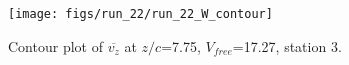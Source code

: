 \begin{figure}[H]
\centering
\texttt{[image: figs/run\_22/run\_22\_W\_contour]}
\caption{Contour plot of $\overline{v_{z}}$ at $z/c$=7.75, $V_{free}$=17.27, station 3.}
\label{fig:run_22_W_contour}
\end{figure}


